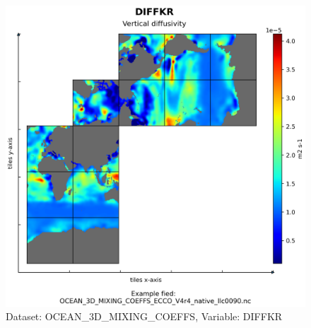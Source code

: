 \begin{figure}[H]
\centering
\includegraphics[scale=0.55]{../images/plots/native_plots/Ocean_3D_Gent-Mcwilliams_Redi_and_Background_Vertical_Diffusivity_Coefficients_for_the_Lat-Lon-Cap_90_(llc90)_Native_Model_Grid_(Version_4_Release_4)/DIFFKR.png}
\caption{Dataset: OCEAN\_3D\_MIXING\_COEFFS, Variable: DIFFKR}
\label{tab:table-OCEAN_3D_MIXING_COEFFS_DIFFKR-Plot}
\end{figure}
\pagebreak
